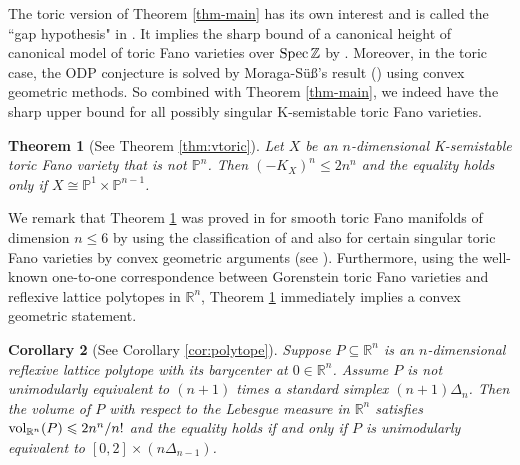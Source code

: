 \documentclass[12pt]{amsart}
\newtheorem{thm}{Theorem}[section]
\newtheorem{cor}[thm]{Corollary}
\newtheorem{conj}[thm]{Conjecture}
\theoremstyle{definition}
\def\spec{{\rm Spec}}
\def\vol{{\rm vol}}
\newcommand{\IP}{{\mathbb P}}
\newcommand{\IQ}{{\mathbb Q}}
\newcommand{\IR}{{\mathbb R}}
\newcommand{\IZ}{{\mathbb Z}}
\newcommand{\lee}{\leqslant}
\begin{document}

The toric version of Theorem \ref{thm-main} has its own interest and is called the ``gap hypothesis" in \cite[Conjecture 3.10]{AB24}. It implies the sharp bound of a canonical height of canonical model of toric Fano varieties over $\spec \,\IZ$ by \cite[Lemma 3.8]{AB24}. 
Moreover, in the toric case, the ODP conjecture is solved by Moraga-Süß's result (\cite{MS24}) using convex geometric methods. So combined with Theorem \ref{thm-main}, we indeed have the sharp upper bound for all possibly singular K-semistable toric Fano varieties.  
\begin{thm}[See Theorem \ref{thm:vtoric}]\label{thm-toric}
Let $X$ be an $n$-dimensional K-semistable toric Fano variety that is not $\IP^n$. Then $(-K_X)^n\le 2n^n$ and the equality holds only if $X\cong \IP^1\times \IP^{n-1}$. 
\end{thm}
We remark that Theorem \ref{thm-toric} was proved in \cite{AB24} for smooth toric Fano manifolds
of dimension $n\lee 6$ by using the classification of \cite{toricdata} and also for certain singular toric Fano varieties by convex geometric arguments (see \cite[Lemma 3.9]{AB24}).
Furthermore, using the well-known one-to-one correspondence between Gorenstein toric Fano varieties and reflexive lattice polytopes in $\IR^n$, Theorem \ref{thm-toric} immediately implies a convex geometric statement.
\begin{cor}[See Corollary \ref{cor:polytope}]\label{cor-lattice}
    Suppose $P\subseteq \IR^n$ is an $n$-dimensional reflexive lattice polytope with its barycenter at $0\in\IR^n$. Assume $P$ is not unimodularly equivalent to $(n+1)$ times a standard simplex $(n+1)\Delta_n$. Then the volume of $P$ with respect to the Lebesgue measure in $\IR^n$ satisfies $\vol_{\IR^n}(P)\lee 2n^n/n!$ and the equality holds if and only if $P$ is unimodularly equivalent to $[0,2]\times (n\Delta_{n-1})$.
\end{cor}
\end{document}
